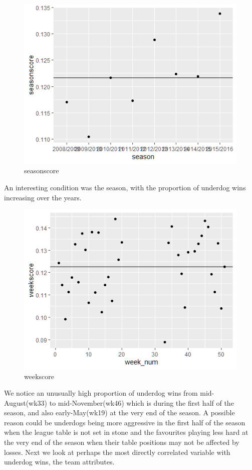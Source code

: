 \documentclass[12pt, a4paper]{article}
\begin{document}
\begin{figure}[!ht]
    \centering
    \includegraphics{season.png}
    \caption{seasonscore}
    \label{fig:season}
\end{figure}
An interesting condition was the season, with the proportion of underdog wins increasing over the years.

\begin{figure}[!ht]
    \centering
    \includegraphics{week.png}
    \caption{weekscore}
    \label{fig:week}
\end{figure}
We notice an unusually high proportion of underdog wins from mid-August(wk33) to mid-November(wk46) which is during the first half of the season, and also early-May(wk19) at the very end of the season. A possible reason could be underdogs being more aggressive in the first half of the season when the league table is not set in stone and the favourites playing less hard at the very end of the season when their table positions may not be affected by losses. Next we look at perhaps the most directly correlated variable with underdog wins, the team attributes.
\end{document}
